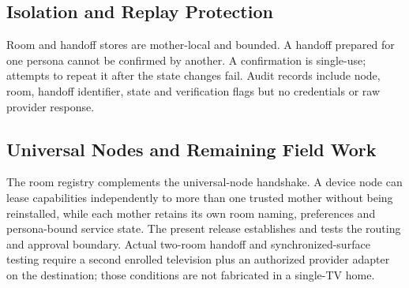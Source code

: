 \subsection{Isolation and Replay Protection}

Room and handoff stores are mother-local and bounded.  A handoff prepared for one
persona cannot be confirmed by another.  A confirmation is single-use; attempts
to repeat it after the state changes fail.  Audit records include node, room,
handoff identifier, state and verification flags but no credentials or raw
provider response.

\subsection{Universal Nodes and Remaining Field Work}

The room registry complements the universal-node handshake.  A device node can
lease capabilities independently to more than one trusted mother without being
reinstalled, while each mother retains its own room naming, preferences and
persona-bound service state.  The present release establishes and tests the
routing and approval boundary.  Actual two-room handoff and synchronized-surface
testing require a second enrolled television plus an authorized provider adapter
on the destination; those conditions are not fabricated in a single-TV home.
